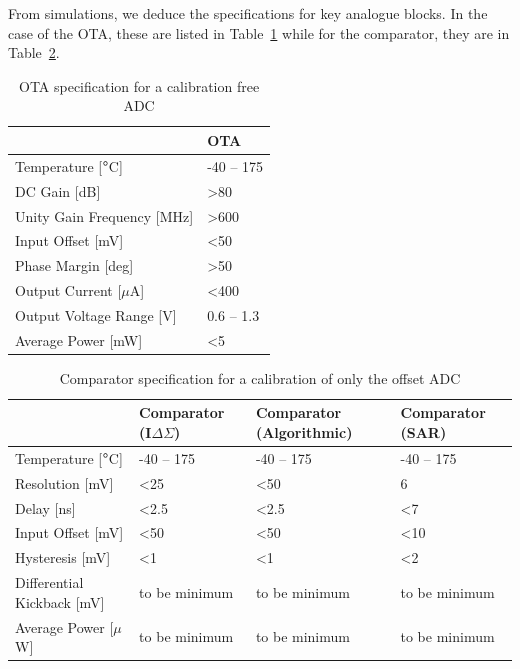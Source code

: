 

\clearpage
From simulations, we deduce the specifications for key analogue blocks. In the case of the OTA, these are listed in Table~\ref{tbl:ota-spec-chapter4} while for the comparator, they are in Table~\ref{tbl:comp-spec-chapter4}.

\begin{table}[htp]
	\centering
	\caption{OTA specification for a calibration free ADC}
	\label{tbl:ota-spec-chapter4}
	\begin{tabular}{@{}ll@{}}
	\toprule
	 & OTA \\ \midrule
	 Temperature {[}$\degree$C{]} & -40 -- 175 \\
	DC Gain {[}dB{]} & \textgreater 80 \\
	Unity Gain Frequency {[}MHz{]} & \textgreater 600 \\
	Input Offset {[}mV{]} & \textless 50 \\
	Phase Margin [deg] & \textgreater 50 \\
	Output Current {[}$\mu$A{]} & \textless 400\\
	Output Voltage Range {[}V{]} & 0.6 -- 1.3 \\
	Average Power {[}mW{]} & \textless 5 \\ \bottomrule
	\end{tabular}
\end{table}

\begin{table}[htp]
	\centering
	\caption{Comparator specification for a calibration of only the offset ADC}
	\label{tbl:comp-spec-chapter4}
	\begin{tabular}{@{}llll@{}}
	\toprule
	 & Comparator (I$\Delta\Sigma$) & Comparator (Algorithmic) & Comparator (SAR) \\ \midrule
	Temperature {[}$\degree$C{]} & -40 -- 175 & -40 -- 175 & -40 -- 175 \\
	Resolution {[}mV{]} & \textless 25 & \textless 50 & 6 \\
	Delay {[}ns{]} & \textless 2.5 & \textless 2.5 & \textless 7 \\
	Input Offset {[}mV{]} & \textless 50 & \textless 50 & \textless 10 \\
	Hysteresis {[}mV{]} & \textless 1 & \textless 1 & \textless 2 \\
	Differential Kickback {[}mV{]} & to be minimum & to be minimum & to be minimum \\
	Average Power {[}$\mu$W{]} & to be minimum & to be minimum & to be minimum \\ \bottomrule
	\end{tabular}
\end{table}

